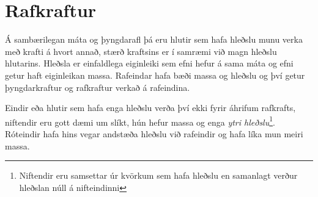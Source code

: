 \chapter{Rafkraftur}
Á sambærilegan máta og þyngdarafl þá eru hlutir sem hafa hleðslu munu verka
með krafti á hvort annað, stærð kraftsins er í samræmi við magn hleðslu
hlutarins. Hleðsla er einfaldlega eiginleiki sem efni hefur á sama máta
og efni getur haft eiginleikan massa. Rafeindar hafa bæði massa og
hleðslu og því getur þyngdarkraftur og rafkraftur verkað á rafeindina.

Eindir eða hlutir sem hafa enga hleðslu verða því ekki fyrir áhrifum
rafkrafts, niftendir eru gott dæmi um slíkt, hún hefur massa og enga
\emph{ytri hleðslu}\footnote{Niftendir eru samsettar úr kvörkum sem
hafa hleðslu en samanlagt verður hleðslan núll á nifteindinni}. Róteindir
hafa hins vegar andstæða hleðslu við rafeindir og hafa líka mun
meiri massa.

